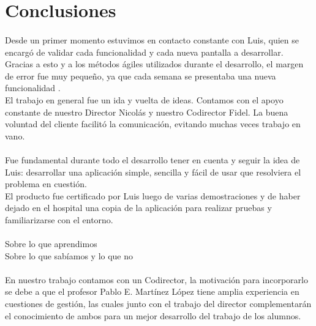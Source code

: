 \section{Conclusiones}


\paragraph{}
Desde un primer momento estuvimos en contacto constante con Luis, quien se encargó de validar cada funcionalidad y cada nueva pantalla a desarrollar. Gracias a esto y a los métodos ágiles utilizados durante el desarrollo, el margen de error fue muy pequeño, ya que cada semana se presentaba una nueva funcionalidad .\\
El trabajo en general fue un ida y vuelta de ideas. Contamos con el apoyo constante de nuestro Director Nicolás y nuestro Codirector Fidel. La buena voluntad del cliente facilitó la comunicación, evitando muchas veces trabajo en vano.\\

\paragraph{}
Fue fundamental durante todo el desarrollo tener en cuenta y seguir la idea de Luis: desarrollar una aplicación simple, sencilla y fácil de usar que resolviera el problema en cuestión.\\
El producto fue certificado por Luis luego de varias demostraciones y de haber dejado en el hospital una copia de la aplicación para realizar pruebas y familiarizarse con el entorno.\\

\paragraph{}


Sobre lo que aprendimos\\
Sobre lo que sabíamos y lo que no\\


\paragraph{}
En nuestro trabajo contamos con un Codirector, la motivación para incorporarlo se debe a que el profesor Pablo E. Martínez López tiene amplia experiencia en cuestiones de gestión, las cuales junto con el trabajo del director complementarán el conocimiento de ambos para un mejor desarrollo del trabajo de los alumnos.
